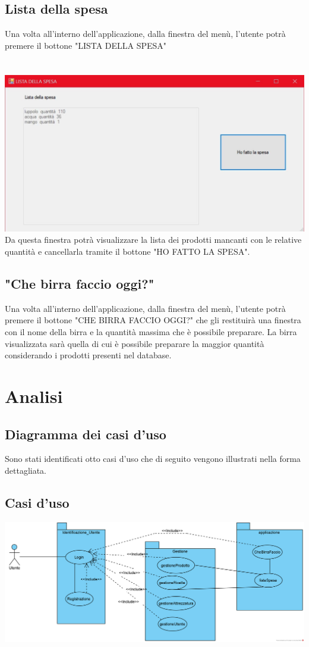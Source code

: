 \documentclass[a4paper, titlepage]{article}
\begin{document}
\subsection{Lista della spesa}
Una volta all'interno dell'applicazione, dalla finestra del menù, l'utente potrà premere il bottone "LISTA DELLA SPESA"\\\\\
\includegraphics[scale=0.30]{Immagini/form/Form ListaSpesa.jpg}
\\Da questa finestra potrà visualizzare la lista dei prodotti mancanti con le relative quantità e cancellarla tramite il bottone "HO FATTO LA SPESA".
\subsection{"Che birra faccio oggi?"}
Una volta all'interno dell'applicazione, dalla finestra del menù, l'utente potrà premere il bottone "CHE BIRRA FACCIO OGGI?" che gli restituirà una finestra con il nome della birra e la quantità massima che è possibile preparare. La birra visualizzata sarà quella di cui è possibile preparare la maggior quantità considerando i prodotti presenti nel database.

\newpage
\section{Analisi}
\subsection{Diagramma dei casi d'uso}
Sono stati identificati otto casi d'uso che di seguito vengono illustrati nella forma dettagliata.
\vphantom{}
\subsection{Casi d'uso}
\vphantom{}
\includegraphics[scale=0.65]{Immagini/Use Case Diagram_Brew Day!.png}
\vphantom{}
\end{document}
